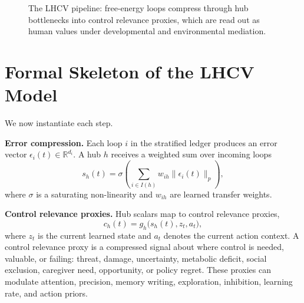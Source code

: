 \documentclass[11pt]{article}
\begin{document}
\begin{figure}[ht]
\centering
{}
\caption{The LHCV pipeline: free-energy loops compress through hub bottlenecks into control relevance proxies, which are read out as human values under developmental and environmental mediation.}
\end{figure}

\section{Formal Skeleton of the LHCV Model}

We now instantiate each step.

\textbf{Error compression.} Each loop $i$ in the stratified ledger \cite{zarncke2025stratification} produces an error vector $\epsilon_i(t) \in \mathbb{R}^{d_i}$. A hub $h$ receives a weighted sum over incoming loops
\begin{equation}
  s_h(t) = \sigma\left(\sum_{i\in I(h)} w_{ih} \lVert \epsilon_i(t) \rVert_p\right),
\end{equation}
where $\sigma$ is a saturating non-linearity and $w_{ih}$ are learned transfer weights.

\textbf{Control relevance proxies.} Hub scalars map to control relevance proxies,
\begin{equation}
  c_h(t) = g_h\big(s_h(t), z_t, a_t\big),
\end{equation}
where $z_t$ is the current learned state and $a_t$ denotes the current action context. A control relevance proxy is a compressed signal about where control is needed, valuable, or failing: threat, damage, uncertainty, metabolic deficit, social exclusion, caregiver need, opportunity, or policy regret. These proxies can modulate attention, precision, memory writing, exploration, inhibition, learning rate, and action priors.
\end{document}
